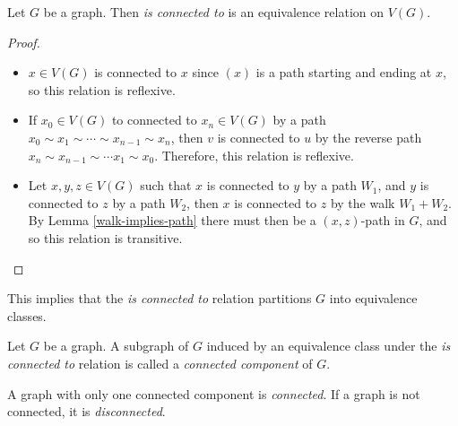 \begin{prop}
    Let $G$ be a graph. Then \emph{is connected to} is an equivalence relation on $V(G)$.
\end{prop}

\begin{proof}\proofbreak
    \begin{itemize}
        \item $x \in V(G)$ is connected to $x$ since $(x)$ is a path starting and ending at $x$, so this relation is reflexive.
        \item If $x_0 \in V(G)$ to connected to $x_n \in V(G)$ by a path $x_0 \sim x_1 \sim \cdots \sim x_{n-1} \sim x_n$, then $v$ is connected to $u$ by the reverse path $x_n \sim x_{n-1} \sim \cdots x_1 \sim x_0$. Therefore, this relation is reflexive.
        \item Let $x, y, z \in V(G)$ such that $x$ is connected to $y$ by a path $W_1$, and $y$ is connected to $z$ by a path $W_2$, then $x$ is connected to $z$ by the walk $W_1 + W_2$. By Lemma \ref{walk-implies-path} there must then be a $(x, z)$-path in $G$, and so this relation is transitive.
    \end{itemize}
\end{proof}

\begin{rmk}
    This implies that the \emph{is connected to} relation partitions $G$ into equivalence classes.
\end{rmk}

\begin{defn}
    Let $G$ be a graph. A subgraph of $G$ induced by an equivalence class under the \emph{is connected to} relation is called a \emph{connected component} of $G$.
\end{defn}

\begin{defn}
    A graph with only one connected component is \emph{connected}. If a graph is not connected, it is \emph{disconnected}.
\end{defn}

